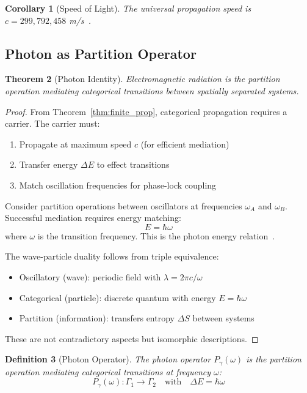 \documentclass[aps,prd,twocolumn,superscriptaddress,floatfix,nofootinbib]{revtex4-2}
\newtheorem{theorem}{Theorem}[section]
\newtheorem{corollary}[theorem]{Corollary}
\newtheorem{definition}[theorem]{Definition}
\theoremstyle{remark}
\newcommand{\Pop}{P}
\newcommand{\Gstate}{\Gamma}
\begin{document}
\begin{corollary}[Speed of Light]
\label{cor:speed_light}
The universal propagation speed is $c = 299,792,458$ m/s~\cite{codata2018}.
\end{corollary}

\subsection{Photon as Partition Operator}

\begin{theorem}[Photon Identity]
\label{thm:photon}
Electromagnetic radiation is the partition operation mediating categorical transitions between spatially separated systems.
\end{theorem}

\begin{proof}
From Theorem~\ref{thm:finite_prop}, categorical propagation requires a carrier. The carrier must:
\begin{enumerate}
\item Propagate at maximum speed $c$ (for efficient mediation)
\item Transfer energy $\Delta E$ to effect transitions
\item Match oscillation frequencies for phase-lock coupling
\end{enumerate}

Consider partition operations between oscillators at frequencies $\omega_A$ and $\omega_B$. Successful mediation requires energy matching:
\begin{equation}
E = \hbar\omega
\end{equation}
where $\omega$ is the transition frequency. This is the photon energy relation~\cite{planck1901,einstein1905}.

The wave-particle duality follows from triple equivalence:
\begin{itemize}
\item Oscillatory (wave): periodic field with $\lambda = 2\pi c/\omega$
\item Categorical (particle): discrete quantum with energy $E = \hbar\omega$
\item Partition (information): transfers entropy $\Delta S$ between systems
\end{itemize}

These are not contradictory aspects but isomorphic descriptions.
\end{proof}

\begin{definition}[Photon Operator]
\label{def:photon_op}
The photon operator $\Pop_\gamma(\omega)$ is the partition operation mediating categorical transitions at frequency $\omega$:
\begin{equation}
\Pop_\gamma(\omega): \Gstate_1 \to \Gstate_2 \quad \text{with} \quad \Delta E = \hbar\omega
\end{equation}
\end{definition}
\end{document}
